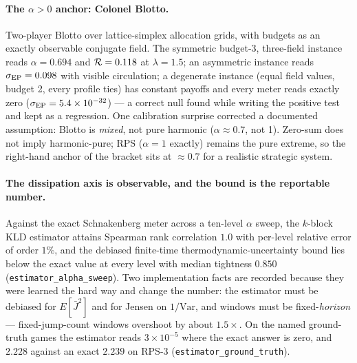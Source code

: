 \paragraph{The $\alpha>0$ anchor: Colonel Blotto.} Two-player Blotto over
lattice-simplex allocation grids, with budgets as an exactly observable
conjugate field. The symmetric budget-3, three-field instance reads
$\alpha=0.694$ and $\mathcal{R}=0.118$ at $\lambda=1.5$; an asymmetric instance reads
$\sigma_{\mathrm{EP}}=0.098$ with visible circulation; a degenerate instance (equal field values,
budget 2, every profile ties) has constant payoffs and every meter reads exactly
zero ($\sigma_{\mathrm{EP}}=5.4\times10^{-32}$) --- a correct null found while writing the
positive test and kept as a regression. One calibration surprise corrected a
documented assumption: Blotto is \emph{mixed}, not pure harmonic
($\alpha\approx0.7$, not 1). Zero-sum does not imply harmonic-pure; RPS
($\alpha=1$ exactly) remains the pure extreme, so the right-hand anchor of the
bracket sits at $\approx0.7$ for a realistic strategic system.

\paragraph{The dissipation axis is observable, and the bound is the reportable
number.} Against the exact Schnakenberg meter across a ten-level $\alpha$ sweep,
the $k$-block KLD estimator \citep{roldan2010} attains Spearman rank correlation
$1.0$ with per-level relative error of order $1\%$, and the debiased finite-time
thermodynamic-uncertainty bound \citep{barato2015,horowitz2017} lies below the
exact value at every level with median tightness $0.850$
(\texttt{estimator\_alpha\_sweep}). Two implementation facts are recorded
because they were learned the hard way and change the number: the estimator must
be debiased for $E[\bar J^2]$ and for Jensen on $1/\mathrm{Var}$, and windows
must be fixed-\emph{horizon} --- fixed-jump-count windows overshoot by about
$1.5\times$. On the named ground-truth games the estimator reads
$3\times10^{-5}$ where the exact answer is zero, and $2.228$ against an exact
$2.239$ on RPS-3 (\texttt{estimator\_ground\_truth}).
